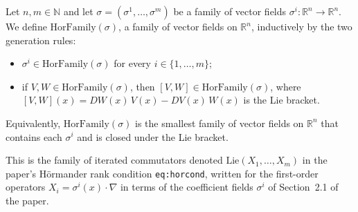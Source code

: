 \begin{definition}
Let $n,m\in\mathbb{N}$ and let $\sigma=(\sigma^1,\dots,\sigma^m)$ be a family of vector fields
$\sigma^i:\mathbb{R}^n\to\mathbb{R}^n$. We define $\mathrm{HorFamily}(\sigma)$, a family of vector
fields on $\mathbb{R}^n$, inductively by the two generation rules:
\begin{itemize}
\item[(i)] $\sigma^i\in\mathrm{HorFamily}(\sigma)$ for every $i\in\{1,\dots,m\}$;
\item[(ii)] if $V,W\in\mathrm{HorFamily}(\sigma)$, then $[V,W]\in\mathrm{HorFamily}(\sigma)$,
where $[V,W](x)=DW(x)\,V(x)-DV(x)\,W(x)$ is the Lie bracket.
\end{itemize}
Equivalently, $\mathrm{HorFamily}(\sigma)$ is the smallest family of vector fields on
$\mathbb{R}^n$ that contains each $\sigma^i$ and is closed under the Lie bracket.

This is the family of iterated commutators denoted $\mathrm{Lie}(X_1,\dots,X_m)$ in the paper's
H\"ormander rank condition \texttt{eq:horcond}, written for the first-order operators
$X_i=\sigma^i(x)\cdot\nabla$ in terms of the coefficient fields $\sigma^i$ of Section~2.1 of the
paper.
\end{definition}
